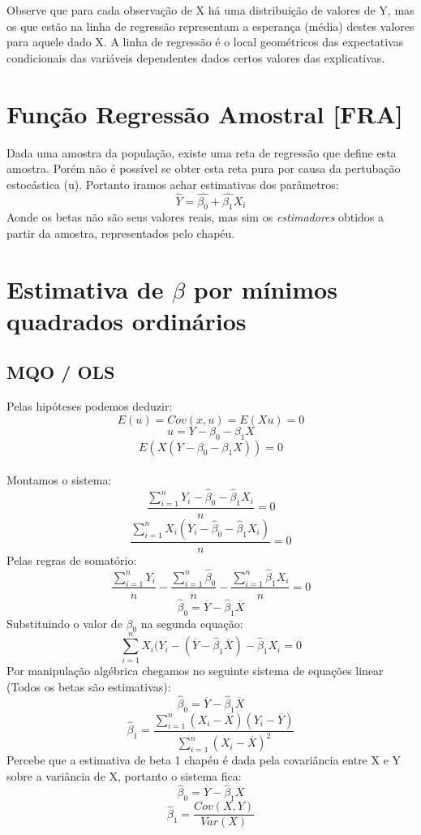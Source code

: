 \documentclass[12pt,a4paper,oneside,brazil]{abntex2}
\begin{document}
Observe que para cada observação de X há uma distribuição de valores de Y, mas os que estão na linha de regressão representam a esperança (média) destes valores para aquele dado X. A linha de regressão é o local geométricos das expectativas condicionais das variáveis dependentes dados certos valores das explicativas.
\clearpage
\section{Função Regressão Amostral [FRA]}
Dada uma amostra da população, existe uma reta de regressão que define esta amostra. Porém não é possível se obter esta reta pura por causa da pertubação estocástica (u). Portanto iramos achar estimativas dos parâmetros:
\[ \hat{Y} = \hat{\beta_0} + \hat{\beta_1} X_i \]
Aonde os betas não são seus valores reais, mas sim os \emph{estimadores} obtidos a partir da amostra, representados pelo chapéu.

\section{Estimativa de $\beta$ por mínimos quadrados ordinários}

\subsection{MQO / OLS}
Pelas hipóteses podemos deduzir:
\[ E(u) = Cov(x,u) = E(X u) = 0 \]
\[ u = Y - \beta_0 - \beta_1 X\]
\[E(X (Y - \beta_0 - \beta_1 X)) = 0 \]\\
Montamos o sistema:
\begin{equation} \label{beta0}
 \frac{\sum \limits_{i=1}^{n} Y_i - \hat{\beta}_0 - \hat\beta_1 X_i}{n} = 0 
 \end{equation}
 \begin{equation} \label{beta1}
\frac{\sum \limits_{i=1}^{n} X_i (Y_i - \hat{\beta}_0 - \hat{\beta}_1 X_i)}{n} = 0
 \end{equation}
Pelas regras de somatório:
\[ \frac{\sum \limits_{i=1}^{n} Y_i}{n} -\frac{\sum \limits_{i=1}^{n} \hat{\beta}_0}{n} - \frac{\sum \limits_{i=1}^{n} \hat{\beta}_1 X_i}{n} = 0 \]
\[  \hat{\beta}_0 = \overline{Y} - \hat{\beta}_1 \overline{X} \]
Substituindo o valor de $\beta_0$ na segunda equação:
\[\sum \limits_{i=1}^{n} X_i (Y_i - ( \overline{Y} - \hat{\beta}_1 \overline{X}) - \hat{\beta}_1 X_i = 0 \]
Por manipulação algébrica chegamos no seguinte sistema de equações linear (Todos os betas são estimativas):
\[ \hat{\beta}_0 = \overline{Y} - \hat{\beta}_1 \overline{X} \]
\[\hat{\beta}_1 = \frac{ \sum \limits_{i=1}^{n} ( X_i - \overline{X}) ( Y_i - \overline{Y})}{{\sum \limits_{i=1}^{n} ( X_i - \overline{X})^2}} \]
Percebe que a estimativa de beta 1 chapéu é dada pela covariância entre X e Y sobre a variância de X, portanto o sistema fica:
\begin{equation}\label{beta0chapeu}
 \hat{\beta}_0 = \overline{Y} - \hat{\beta}_1 \overline{X} 
\end{equation}
\begin{equation} \label{beta1chapeu}
\hat{\beta}_1 = \frac{Cov(X,Y)}{Var(X)} 
\end{equation}
\end{document}
